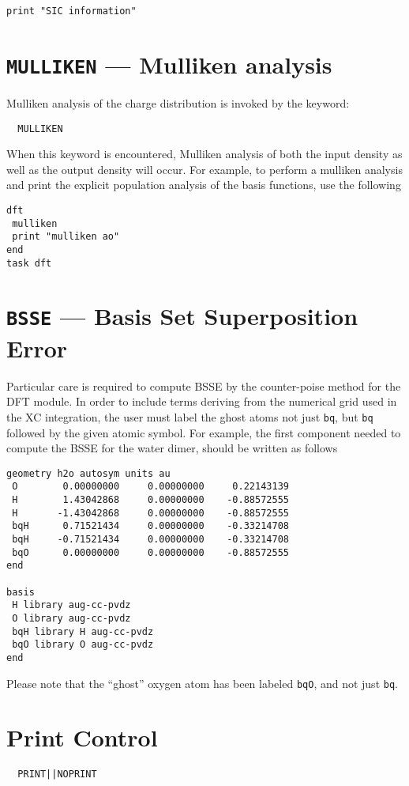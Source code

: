 \begin{verbatim}
print "SIC information"
\end{verbatim}


\section{{\tt MULLIKEN} --- Mulliken analysis}
Mulliken analysis of the charge distribution is invoked by the keyword:
\begin{verbatim}
  MULLIKEN
\end{verbatim}
When this keyword is encountered, Mulliken analysis of both the input 
density as well as the output density will occur.
For example, to perform a mulliken analysis and print the
explicit population analysis of the basis functions, use
the following
\begin{verbatim}
dft
 mulliken
 print "mulliken ao"
end
task dft
\end{verbatim}


\section{{\tt BSSE} --- Basis Set Superposition Error}

Particular care is required to compute BSSE by the counter-poise
method for the DFT module. In order to include terms deriving from
the numerical grid used in the XC integration, the user must label
the ghost atoms not just {\tt bq}, but {\tt bq} followed by the given
atomic symbol. For example, the first component needed to compute the
BSSE for the water dimer, should be written as follows

\begin{verbatim}
geometry h2o autosym units au
 O        0.00000000     0.00000000     0.22143139
 H        1.43042868     0.00000000    -0.88572555
 H       -1.43042868     0.00000000    -0.88572555
 bqH      0.71521434     0.00000000    -0.33214708
 bqH     -0.71521434     0.00000000    -0.33214708
 bqO      0.00000000     0.00000000    -0.88572555
end

basis
 H library aug-cc-pvdz
 O library aug-cc-pvdz
 bqH library H aug-cc-pvdz
 bqO library O aug-cc-pvdz
end
\end{verbatim}

Please note that the ``ghost'' oxygen atom has been labeled {\tt bqO},
and not just {\tt bq}.
\section{Print Control}
\begin{verbatim}
  PRINT||NOPRINT
\end{verbatim}

